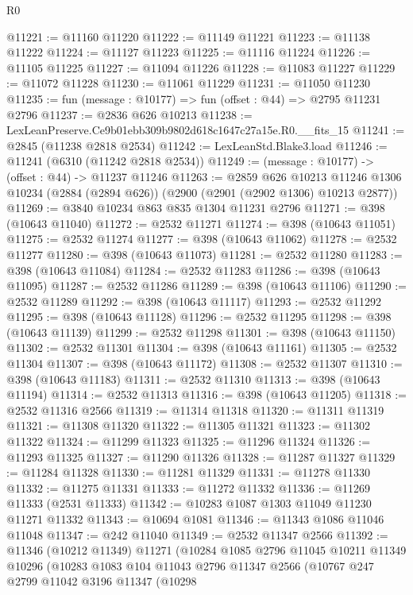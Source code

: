 \begin{lexlean}{R0}
\begin{coremodule}
@11221 := @11160 @11220
@11222 := @11149 @11221
@11223 := @11138 @11222
@11224 := @11127 @11223
@11225 := @11116 @11224
@11226 := @11105 @11225
@11227 := @11094 @11226
@11228 := @11083 @11227
@11229 := @11072 @11228
@11230 := @11061 @11229
@11231 := @11050 @11230
@11235 := fun (message : @10177) => fun (offset : @44) => @2795 @11231 @2796
@11237 := @2836 @626 @10213
@11238 := LexLeanPreserve.Ce9b01ebb309b9802d618c1647c27a15e.R0.__fits_15
@11241 := @2845 (@11238 @2818 @2534)
@11242 := LexLeanStd.Blake3.load
@11246 := @11241 (@6310 (@11242 @2818 @2534))
@11249 := (message : @10177) -> (offset : @44) -> @11237 @11246
@11263 := @2859
    @626
    @10213
    @11246
    @1306
    @10234
    (@2884 (@2894 @626))
    (@2900 (@2901 (@2902 @1306) @10213 @2877))
@11269 := @3840 @10234 @863 @835 @1304 @11231 @2796
@11271 := @398 (@10643 @11040)
@11272 := @2532 @11271
@11274 := @398 (@10643 @11051)
@11275 := @2532 @11274
@11277 := @398 (@10643 @11062)
@11278 := @2532 @11277
@11280 := @398 (@10643 @11073)
@11281 := @2532 @11280
@11283 := @398 (@10643 @11084)
@11284 := @2532 @11283
@11286 := @398 (@10643 @11095)
@11287 := @2532 @11286
@11289 := @398 (@10643 @11106)
@11290 := @2532 @11289
@11292 := @398 (@10643 @11117)
@11293 := @2532 @11292
@11295 := @398 (@10643 @11128)
@11296 := @2532 @11295
@11298 := @398 (@10643 @11139)
@11299 := @2532 @11298
@11301 := @398 (@10643 @11150)
@11302 := @2532 @11301
@11304 := @398 (@10643 @11161)
@11305 := @2532 @11304
@11307 := @398 (@10643 @11172)
@11308 := @2532 @11307
@11310 := @398 (@10643 @11183)
@11311 := @2532 @11310
@11313 := @398 (@10643 @11194)
@11314 := @2532 @11313
@11316 := @398 (@10643 @11205)
@11318 := @2532 @11316 @2566
@11319 := @11314 @11318
@11320 := @11311 @11319
@11321 := @11308 @11320
@11322 := @11305 @11321
@11323 := @11302 @11322
@11324 := @11299 @11323
@11325 := @11296 @11324
@11326 := @11293 @11325
@11327 := @11290 @11326
@11328 := @11287 @11327
@11329 := @11284 @11328
@11330 := @11281 @11329
@11331 := @11278 @11330
@11332 := @11275 @11331
@11333 := @11272 @11332
@11336 := @11269 @11333 (@2531 @11333)
@11342 := @10283 @1087 @1303 @11049 @11230 @11271 @11332
@11343 := @10694 @1081
@11346 := @11343 @1086 @11046 @11048
@11347 := @242 @11040
@11349 := @2532 @11347 @2566
@11392 := @11346
    (@10212 @11349)
    @11271
    (@10284
      @1085
      @2796
      @11045
      @10211
      @11349
      @10296
      (@10283
        @1083
        @104
        @11043
        @2796
        @11347
        @2566
        (@10767
          @247
          @2799
          @11042
          @3196
          @11347
          (@10298

\end{coremodule}
\end{lexlean}

